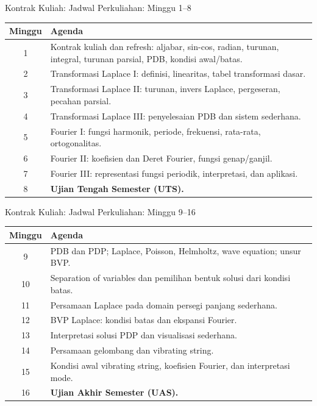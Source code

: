 \documentclass[aspectratio=169,11pt]{beamer}
\begin{document}
\begin{frame}{Kontrak Kuliah: Jadwal Perkuliahan: Minggu 1--8}
\scriptsize
\begin{tabular}{c p{9.8cm}}
\toprule
\textbf{Minggu} & \textbf{Agenda} \\
\midrule
1 & Kontrak kuliah dan refresh: aljabar, sin-cos, radian, turunan, integral, turunan parsial, PDB, kondisi awal/batas. \\
2 & Transformasi Laplace I: definisi, linearitas, tabel transformasi dasar. \\
3 & Transformasi Laplace II: turunan, invers Laplace, pergeseran, pecahan parsial. \\
4 & Transformasi Laplace III: penyelesaian PDB dan sistem sederhana. \\
5 & Fourier I: fungsi harmonik, periode, frekuensi, rata-rata, ortogonalitas. \\
6 & Fourier II: koefisien dan Deret Fourier, fungsi genap/ganjil. \\
7 & Fourier III: representasi fungsi periodik, interpretasi, dan aplikasi. \\
8 & \textbf{Ujian Tengah Semester (UTS).} \\
\bottomrule
\end{tabular}
\end{frame}

\begin{frame}{Kontrak Kuliah: Jadwal Perkuliahan: Minggu 9--16}
\scriptsize
\begin{tabular}{c p{9.8cm}}
\toprule
\textbf{Minggu} & \textbf{Agenda} \\
\midrule
9 & PDB dan PDP; Laplace, Poisson, Helmholtz, wave equation; unsur BVP. \\
10 & Separation of variables dan pemilihan bentuk solusi dari kondisi batas. \\
11 & Persamaan Laplace pada domain persegi panjang sederhana. \\
12 & BVP Laplace: kondisi batas dan ekspansi Fourier. \\
13 & Interpretasi solusi PDP dan visualisasi sederhana. \\
14 & Persamaan gelombang dan vibrating string. \\
15 & Kondisi awal vibrating string, koefisien Fourier, dan interpretasi mode. \\
16 & \textbf{Ujian Akhir Semester (UAS).} \\
\bottomrule
\end{tabular}
\end{frame}
\end{document}
